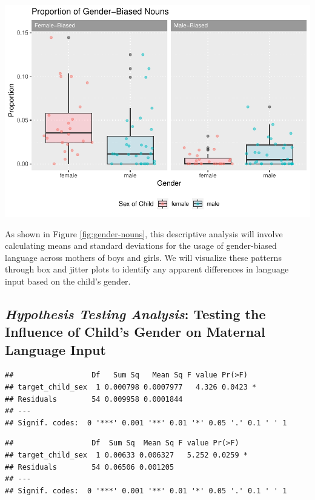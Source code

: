 \documentclass[
  man]{apa6}
\begin{document}
\includegraphics{My-Notebook_files/figure-latex/gender-nouns-1.pdf}

As shown in Figure \ref{fig:gender-nouns}, this descriptive analysis will involve calculating means and standard deviations for the usage of gender-biased language across mothers of boys and girls. We will visualize these patterns through box and jitter plots to identify any apparent differences in language input based on the child's gender.

\hypertarget{hypothesis-testing-analysis-testing-the-influence-of-childs-gender-on-maternal-language-input}{%
\subsection{\texorpdfstring{\emph{Hypothesis Testing Analysis}: Testing the Influence of Child's Gender on Maternal Language Input}{Hypothesis Testing Analysis: Testing the Influence of Child's Gender on Maternal Language Input}}\label{hypothesis-testing-analysis-testing-the-influence-of-childs-gender-on-maternal-language-input}}

\begin{verbatim}
##                  Df   Sum Sq   Mean Sq F value Pr(>F)  
## target_child_sex  1 0.000798 0.0007977   4.326 0.0423 *
## Residuals        54 0.009958 0.0001844                 
## ---
## Signif. codes:  0 '***' 0.001 '**' 0.01 '*' 0.05 '.' 0.1 ' ' 1
\end{verbatim}

\begin{verbatim}
##                  Df  Sum Sq  Mean Sq F value Pr(>F)  
## target_child_sex  1 0.00633 0.006327   5.252 0.0259 *
## Residuals        54 0.06506 0.001205                 
## ---
## Signif. codes:  0 '***' 0.001 '**' 0.01 '*' 0.05 '.' 0.1 ' ' 1
\end{verbatim}
\end{document}
